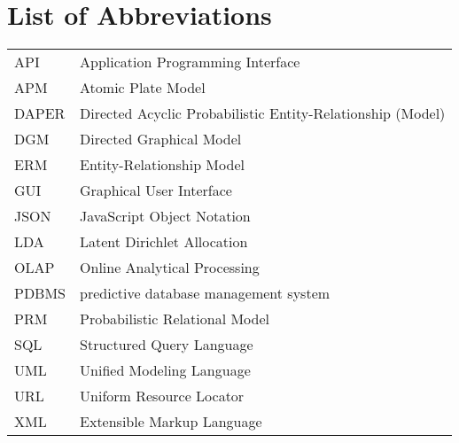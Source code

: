 \section*{List of Abbreviations}

\begin{tabular}{ll}
API & Application Programming Interface\\
APM & Atomic Plate Model\\
DAPER & Directed Acyclic Probabilistic Entity-Relationship (Model)\\
DGM & Directed Graphical Model\\
ERM & Entity-Relationship Model\\
GUI & Graphical User Interface\\
JSON & JavaScript Object Notation\\
LDA & Latent Dirichlet Allocation\\
OLAP & Online Analytical Processing\\
PDBMS & predictive database management system\\
PRM & Probabilistic Relational Model\\
SQL & Structured Query Language\\
UML & Unified Modeling Language\\
URL & Uniform Resource Locator\\
XML & Extensible Markup Language

\end{tabular}
